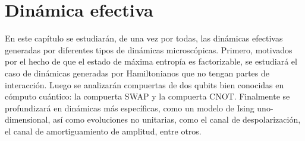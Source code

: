 \chapter{Dinámica efectiva}

En este capítulo se estudiarán, de una vez por todas, las dinámicas efectivas generadas por diferentes tipos de dinámicas microscópicas. Primero, motivados por el hecho de que el estado de máxima entropía es factorizable, se estudiará el caso de dinámicas generadas por Hamiltonianos que no tengan partes de interacción. Luego se analizarán compuertas de dos qubits bien conocidas en cómputo cuántico: la compuerta SWAP y la compuerta CNOT. Finalmente se profundizará en dinámicas más específicas, como un modelo de Ising uno-dimensional, así como evoluciones no unitarias, como el canal de despolarización, el canal de amortiguamiento de amplitud, entre otros.




\newpage